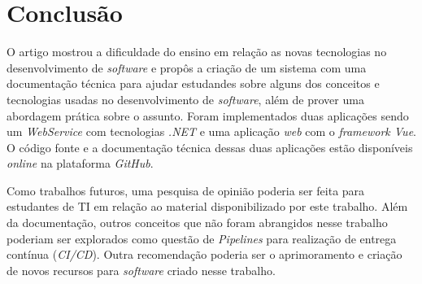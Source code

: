 \documentclass[12pt]{article}
\begin{document}
\section{Conclusão}\label{Conclusao}

O artigo mostrou a dificuldade do ensino em relação as novas tecnologias no desenvolvimento de \textit{software}
e propôs a criação de um sistema com uma documentação técnica para ajudar estudandes sobre alguns dos
conceitos e tecnologias usadas no desenvolvimento de \textit{software}, além de prover uma abordagem prática
sobre o assunto. Foram implementados duas aplicações sendo um \textit{WebService} com tecnologias \textit{.NET} e
uma aplicação \textit{web} com o \textit{framework Vue}. O código fonte e a documentação técnica dessas duas aplicações
estão disponíveis \textit{online} na plataforma \textit{GitHub}.

Como trabalhos futuros, uma pesquisa de opinião poderia ser feita para estudantes de TI em relação ao material
disponibilizado por este trabalho. Além da documentação, outros conceitos que não foram abrangidos nesse trabalho poderiam
ser explorados como questão de \textit{Pipelines} para realização de entrega contínua (\textit{CI/CD}).
Outra recomendação poderia ser o aprimoramento e criação de novos recursos para \textit{software} criado nesse trabalho.



\end{document}

